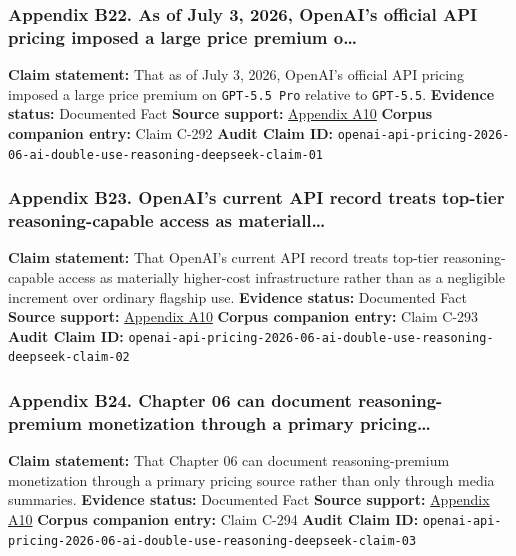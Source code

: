 \documentclass[
  american,
  11pt,
  letterpaper,
]{article}
\begin{document}
\subsubsection{Appendix B22. As of July 3, 2026, OpenAI's official API
pricing imposed a large price premium
o\ldots{}}\label{ch-06-appendix-b22-as-of-july-3-2026-openai-s-official-api-pricing-imposed-a-large-price-premium-o}

\textbf{Claim statement:} That as of July 3, 2026, OpenAI's official API
pricing imposed a large price premium on \texttt{GPT-5.5\ Pro} relative
to \texttt{GPT-5.5}. \textbf{Evidence status:} Documented Fact
\textbf{Source support:}
\hyperref[ch-06-appendix-a10-pricing-openai-api]{Appendix A10}
\textbf{Corpus companion entry:} Claim C-292 \textbf{Audit Claim ID:}
\texttt{openai-api-pricing-2026-06-ai-double-use-reasoning-deepseek-claim-01}

\subsubsection{Appendix B23. OpenAI's current API record treats top-tier
reasoning-capable access as
materiall\ldots{}}\label{ch-06-appendix-b23-openai-s-current-api-record-treats-top-tier-reasoning-capable-access-as-materiall}

\textbf{Claim statement:} That OpenAI's current API record treats
top-tier reasoning-capable access as materially higher-cost
infrastructure rather than as a negligible increment over ordinary
flagship use. \textbf{Evidence status:} Documented Fact \textbf{Source
support:} \hyperref[ch-06-appendix-a10-pricing-openai-api]{Appendix A10}
\textbf{Corpus companion entry:} Claim C-293 \textbf{Audit Claim ID:}
\texttt{openai-api-pricing-2026-06-ai-double-use-reasoning-deepseek-claim-02}

\subsubsection{Appendix B24. Chapter 06 can document reasoning-premium
monetization through a primary
pricing\ldots{}}\label{ch-06-appendix-b24-chapter-06-can-document-reasoning-premium-monetization-through-a-primary-pricing}

\textbf{Claim statement:} That Chapter 06 can document reasoning-premium
monetization through a primary pricing source rather than only through
media summaries. \textbf{Evidence status:} Documented Fact
\textbf{Source support:}
\hyperref[ch-06-appendix-a10-pricing-openai-api]{Appendix A10}
\textbf{Corpus companion entry:} Claim C-294 \textbf{Audit Claim ID:}
\texttt{openai-api-pricing-2026-06-ai-double-use-reasoning-deepseek-claim-03}
\end{document}
